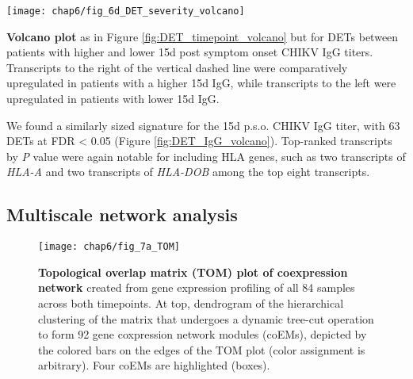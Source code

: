 \begin{marginfigure}[-2cm]
  \centering
  \texttt{[image: chap6/fig\_6d\_DET\_severity\_volcano]}
  \caption[Volcano plot of differentially expressed host transcripts for symptom severity]{
  \textbf{Volcano plot} as in Figure \ref{fig:DET_timepoint_volcano} but for DETs between patients with higher and lower 15d post symptom onset CHIKV IgG titers. Transcripts to the right of the vertical dashed line were comparatively upregulated in patients with a higher 15d IgG, while transcripts to the left were upregulated in patients with lower 15d IgG.
  }
  \label{fig:DET_IgG_volcano}
\end{marginfigure}

We found a similarly sized signature for the 15d p.s.o. CHIKV IgG titer, with 63 DETs at FDR < 0.05 (Figure \ref{fig:DET_IgG_volcano}). Top-ranked transcripts by \emph{P} value were again notable for including HLA genes, such as two transcripts of \emph{HLA-A} and two transcripts of \emph{HLA-DOB} among the top eight transcripts.

\subsection{Multiscale network analysis}

\begin{figure}[htb]
  \centering
  \texttt{[image: chap6/fig\_7a\_TOM]}
  \caption[Topological overlap matrix (TOM) plot of coexpression network]{
  \textbf{Topological overlap matrix (TOM) plot of coexpression network} created from gene expression profiling of all 84 samples across both timepoints. At top, dendrogram of the hierarchical clustering of the matrix that undergoes a dynamic tree-cut operation to form 92 gene coxpression network modules (coEMs), depicted by the colored bars on the edges of the TOM plot (color assignment is arbitrary). Four coEMs are highlighted (boxes).
  }
  \label{fig:chik_TOM}
\end{figure}

